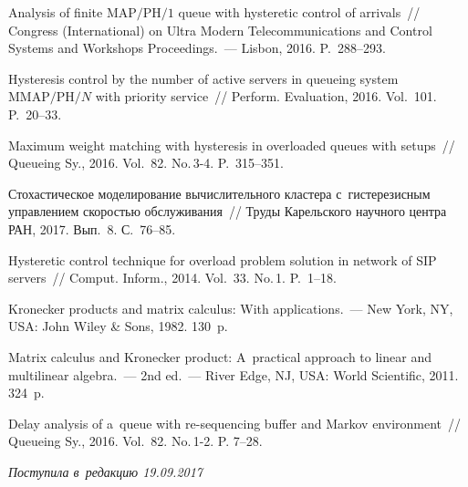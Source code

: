 

\vspace*{18pt}


 \begin{multicols}{2}

\renewcommand{\bibname}{\protect\rmfamily Литература}

{\small\frenchspacing
{%
\begin{thebibliography}{9}

Analysis of finite ${\mathrm{MAP}/\mathrm{PH}/1}$ queue with hysteretic control of arrivals~// 
 Congress (International) on Ultra Modern Telecommunications and Control 
Systems and Workshops Proceedings.~--- Lisbon, 2016.  P.~288--293.


Hysteresis control by the number of active servers in queueing system 
$\mathrm{MMAP}/\mathrm{PH}/N$
with priority service~// Perform. Evaluation, 2016. Vol.~101. P.~20--33.

Maximum weight matching with hysteresis in overloaded queues with setups~// 
Queueing Sy., 2016. Vol.~82. No.\,3-4. P.~315--351.

Стохастическое моделирование вычислительного кластера 
с~гистерезисным управлением скоростью обслуживания~//
Труды Карельского научного центра РАН, 2017. Вып.~8. С.~76--85.

Hysteretic control technique for overload problem solution in network of SIP servers~//
Comput. Inform., 2014. Vol.~33. No.\,1. P.~1--18.





Kronecker products and matrix calculus: With applications.~--- 
New York, NY, USA: John Wiley \& Sons, 1982. 130~p.

Matrix calculus and Kronecker product: A~practical
approach to linear and multilinear algebra.~--- 2nd ed.~---
River Edge, NJ, USA: World Scientific, 2011. 324~p.

Delay analysis of a~queue with re-sequencing buffer
and Markov environment~// Queueing Sy., 2016. Vol.~82. 
No.\,1-2. P. 7--28.

\end{thebibliography}
} }

\end{multicols}

 \label{end\stat}

 \vspace*{-3pt}

\hfill{\small\textit{Поступила в~редакцию  19.09.2017}}
\renewcommand{\figurename}{\protect\bf Рис.}
\renewcommand{\tablename}{\protect\bf Таблица} 